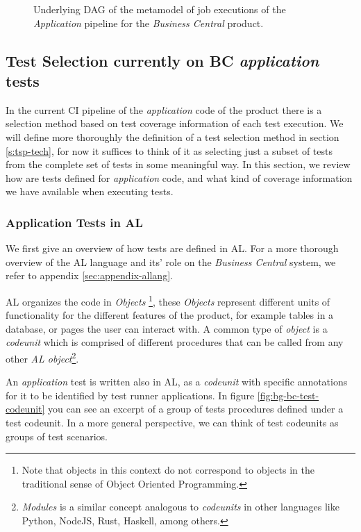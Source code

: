 \begin{figure}
    \centering
    \def\svgscale{0.1}
    
    \caption{Underlying DAG of the metamodel of job executions of the \emph{Application} pipeline for the \emph{Business Central} product.}
    \label{fig:full-job-metamodel-dag}
\end{figure}

\subsection{Test Selection currently on BC \emph{application} tests}
\label{sec:bg-bc-test-selection-currently}

In the current CI pipeline of the \emph{application} code of the product there is 
a selection method based on test coverage information of each test execution. We will
define more thoroughly the definition of a test selection method in section \ref{s:tsp-tech},
for now it suffices to think of it as selecting just a subset of tests from the complete
set of tests in some meaningful way. In this section, we review how are tests defined for \emph{application} code, and what kind
of coverage information we have available when executing tests.

\subsubsection{Application Tests in AL}\label{sec:app-tests-al}
We first give an overview of how tests are defined in AL.  For a more thorough overview of the AL
language and its' role on the \emph{Business Central} system, we refer to appendix \ref{sec:appendix-allang}.

AL organizes the code in \emph{Objects} \footnote{Note that objects in this context do not 
correspond to objects in the traditional sense of Object Oriented Programming.}, these
\emph{Objects} represent different units of functionality for the different features of the
product, for example tables in a database, or pages the user can interact with. A common 
type of \emph{object} is a \emph{codeunit} which is comprised of different procedures that
can be called from any other \emph{AL object}\footnote{\emph{Modules} is a similar concept analogous
to \emph{codeunits} in other languages like Python, NodeJS, Rust, Haskell, among others.}.

An \emph{application} test is written also in AL, as a \emph{codeunit} with specific annotations for it to 
be identified by test runner applications. In figure \ref{fig:bg-bc-test-codeunit} you can see
an excerpt of a group of tests procedures defined under a test codeunit. In a more general perspective, 
we can think of test codeunits as groups of test scenarios.

